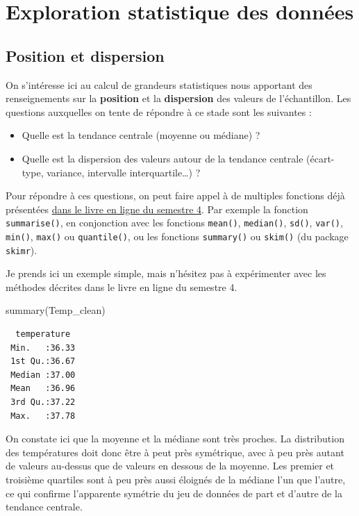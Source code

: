 \documentclass[
  french,
  a4paper,
  DIV=11,
  numbers=noendperiod,
  oneside]{scrreprt}
\newenvironment{Shaded}{}{}
\newcommand{\FunctionTok}[1]{\textcolor[rgb]{0.44,0.26,0.76}{#1}}
\newcommand{\NormalTok}[1]{\textcolor[rgb]{0.14,0.16,0.18}{#1}}
\providecommand{\tightlist}{%
  \setlength{\itemsep}{0pt}\setlength{\parskip}{0pt}}
\begin{document}
\section{Exploration statistique des données}\label{sec-eda}

\subsection{Position et dispersion}\label{position-et-dispersion}

On s'intéresse ici au calcul de grandeurs statistiques nous apportant
des renseignements sur la \textbf{position} et la \textbf{dispersion}
des valeurs de l'échantillon. Les questions auxquelles on tente de
répondre à ce stade sont les suivantes :

\begin{itemize}
\tightlist
\item
  Quelle est la tendance centrale (moyenne ou médiane) ?
\item
  Quelle est la dispersion des valeurs autour de la tendance centrale
  (écart-type, variance, intervalle interquartile\ldots) ?
\end{itemize}

Pour répondre à ces questions, on peut faire appel à de multiples
fonctions déjà présentées
\href{https://besibo.github.io/BiometrieS4/01-dispersion.html}{dans le
livre en ligne du semestre 4}. Par exemple la fonction
\texttt{summarise()}, en conjonction avec les fonctions \texttt{mean()},
\texttt{median()}, \texttt{sd()}, \texttt{var()}, \texttt{min()},
\texttt{max()} ou \texttt{quantile()}, ou les fonctions
\texttt{summary()} ou \texttt{skim()} (du package \texttt{skimr}).

Je prends ici un exemple simple, mais n'hésitez pas à expérimenter avec
les méthodes décrites dans le livre en ligne du semestre 4.

\begin{Shaded}
\begin{Highlighting}[]
\FunctionTok{summary}\NormalTok{(Temp\_clean)}
\end{Highlighting}
\end{Shaded}

\begin{verbatim}
  temperature   
 Min.   :36.33  
 1st Qu.:36.67  
 Median :37.00  
 Mean   :36.96  
 3rd Qu.:37.22  
 Max.   :37.78  
\end{verbatim}

On constate ici que la moyenne et la médiane sont très proches. La
distribution des températures doit donc être à peut près symétrique,
avec à peu près autant de valeurs au-dessus que de valeurs en dessous de
la moyenne. Les premier et troisième quartiles sont à peu près aussi
éloignés de la médiane l'un que l'autre, ce qui confirme l'apparente
symétrie du jeu de données de part et d'autre de la tendance centrale.
\end{document}
